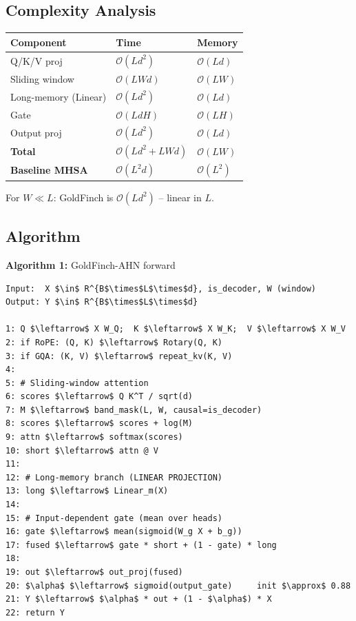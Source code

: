 \subsection{Complexity Analysis}

\begin{table}[H]
\centering
\small
\begin{tabular}{lll}
\toprule
\textbf{Component} & \textbf{Time} & \textbf{Memory} \\
\midrule
Q/K/V proj & $\mathcal{O}(Ld^2)$ & $\mathcal{O}(Ld)$ \\
Sliding window & $\mathcal{O}(LWd)$ & $\mathcal{O}(LW)$ \\
Long-memory (Linear) & $\mathcal{O}(Ld^2)$ & $\mathcal{O}(Ld)$ \\
Gate & $\mathcal{O}(LdH)$ & $\mathcal{O}(LH)$ \\
Output proj & $\mathcal{O}(Ld^2)$ & $\mathcal{O}(Ld)$ \\
\textbf{Total} & $\mathcal{O}(Ld^2 + LWd)$ & $\mathcal{O}(LW)$ \\
\textbf{Baseline MHSA} & $\mathcal{O}(L^2 d)$ & $\mathcal{O}(L^2)$ \\
\bottomrule
\end{tabular}
\end{table}

For $W \ll L$: GoldFinch is $\mathcal{O}(L d^2)$ -- linear in $L$.

\subsection{Algorithm}

\textbf{Algorithm 1:} GoldFinch-AHN forward
\begin{lstlisting}
Input:  X $\in$ R^{B$\times$L$\times$d}, is_decoder, W (window)
Output: Y $\in$ R^{B$\times$L$\times$d}

1: Q $\leftarrow$ X W_Q;  K $\leftarrow$ X W_K;  V $\leftarrow$ X W_V
2: if RoPE: (Q, K) $\leftarrow$ Rotary(Q, K)
3: if GQA: (K, V) $\leftarrow$ repeat_kv(K, V)
4:
5: # Sliding-window attention
6: scores $\leftarrow$ Q K^T / sqrt(d)
7: M $\leftarrow$ band_mask(L, W, causal=is_decoder)
8: scores $\leftarrow$ scores + log(M)
9: attn $\leftarrow$ softmax(scores)
10: short $\leftarrow$ attn @ V
11:
12: # Long-memory branch (LINEAR PROJECTION)
13: long $\leftarrow$ Linear_m(X)
14:
15: # Input-dependent gate (mean over heads)
16: gate $\leftarrow$ mean(sigmoid(W_g X + b_g))
17: fused $\leftarrow$ gate * short + (1 - gate) * long
18:
19: out $\leftarrow$ out_proj(fused)
20: $\alpha$ $\leftarrow$ sigmoid(output_gate)     init $\approx$ 0.88
21: Y $\leftarrow$ $\alpha$ * out + (1 - $\alpha$) * X
22: return Y
\end{lstlisting}

